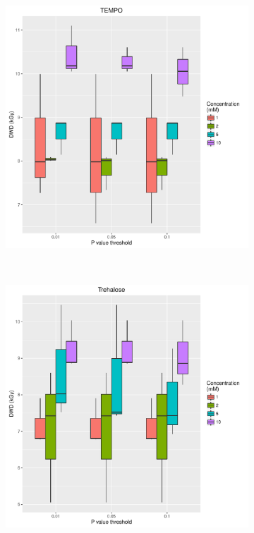 \begin{figure}
\begin{subfigure}[b]{0.75\textwidth}
            \caption{}
            \label{}
    \end{subfigure}
\end{figure}
\begin{figure}
    \ContinuedFloat
    \centering
    \begin{subfigure}[b]{0.75\textwidth}
            \centering
            \includegraphics[width=\textwidth]{figures/saxs/TEMPO_PThresh_comp.pdf}
            \caption{}
            \label{}
    \end{subfigure}
    \\
    \begin{subfigure}[b]{0.75\textwidth}
            \centering
            \includegraphics[width=\textwidth]{figures/saxs/Trehalose_PThresh_comp.pdf}

\end{subfigure}
\end{figure}
